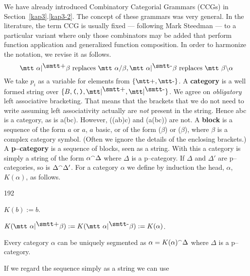 We have already introduced Combinatory Categorial Grammars
(CCGs) in Section~\ref{kap3}.\ref{kap3-2}. The concept of these grammars
was very general. In the literature, the term CCG is usually
fixed --- following Mark Steedman --- to a particular variant
where only those combinators may be added that perform
function application and generalized function composition.
In order to harmonize the notation, we revise it as follows.
\begin{equation}
\mbox{\mtt $\alpha$\fslash$\beta$} 
	\text{ replaces }\mbox{\mtt $\alpha${\tf}$\beta$}, 
\mbox{\mtt $\alpha$\bslash$\beta$} 
	\text{ replaces }\mbox{\mtt $\beta$\tb$\alpha$}
\end{equation}
We take $p_i$ as a variable for elements from $\{\mbox{\mtt\symbol{43}}, 
\mbox{\mtt\symbol{45}}\}$. A \textbf{category} is a well formed 
string over $\{B, \mbox{\tt (}, \mbox{\tt )}, \mbox{\mtt\fslash}, 
\mbox{\mtt\bslash}\}$. We agree on {\it obligatory\/} left associative 
bracketing. That means that the brackets that we do not need to 
write assuming left associativity actually are {\it not\/} present 
in the string. Hence {\mtt a{\fslash}b{\bslash}c} is a category, as 
is {\mtt a{\fslash}(b{\bslash}c)}. However, 
{\mtt ((a{\fslash}b){\bslash}c)} and {\mtt (a{\fslash}(b{\bslash}c))}
are not. A \textbf{block} is a sequence of the form 
{\mtt {\fslash}$a$} or {\mtt {\bslash}$a$}, $a$ basic, or of 
the form {\mtt {\fslash}($\beta$)} or {\mtt {\bslash}($\beta$)},
where $\beta$ is a complex category symbol. (Often we ignore 
the details of the enclosing brackets.)
A \textbf{p--category} is a sequence of blocks, seen as a string.
With this a category is simply a string of the form
$\alpha {^{\smallfrown}} \Delta$ where $\Delta$ is a  p--category.
If $\Delta$ and $\Delta'$ are p--categories, so is
$\Delta {^{\smallfrown}} \Delta'$. For a category $\alpha$ we define
by induction the head, $\alpha$, $K(\alpha)$, as follows.
\begin{dingautolist}{192}
\item $K(b) := b$.
\item $K(\mbox{\mtt $\alpha${\fslash}$\beta$}) := 
K(\mbox{\mtt $\alpha${\bslash}$\beta$}) := K(\alpha)$.
\end{dingautolist}
\begin{lem}
Every category $\alpha$ can be uniquely segmented as
$\alpha = K(\alpha){^{\smallfrown}}\Delta$ where $\Delta$ is a
p--category.
\end{lem}
If we regard the sequence simply as a string we can use 
